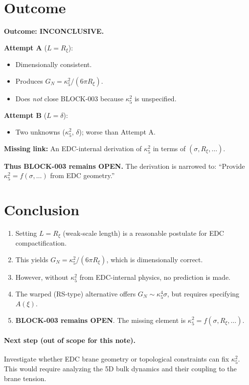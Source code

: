 \documentclass[11pt,a4paper]{article}
\begin{document}
\section{Outcome}
\label{sec:outcome}

\begin{failbox}
\textbf{Outcome: INCONCLUSIVE.}

\textbf{Attempt A} ($L = R_\xi$):
\begin{itemize}[nosep]
    \item Dimensionally consistent.
    \item Produces $G_N = \kappa_5^2 / (6\pi R_\xi)$.
    \item Does \emph{not} close BLOCK-003 because $\kappa_5^2$ is unspecified.
\end{itemize}

\textbf{Attempt B} ($L = \delta$):
\begin{itemize}[nosep]
    \item Two unknowns ($\kappa_5^2$, $\delta$); worse than Attempt A.
\end{itemize}

\textbf{Missing link:}
An EDC-internal derivation of $\kappa_5^2$ in terms of $(\sigma, R_\xi, \ldots)$.

\textbf{Thus BLOCK-003 remains OPEN.}
The derivation is narrowed to: ``Provide $\kappa_5^2 = f(\sigma, \ldots)$ from EDC geometry.''
\end{failbox}

\section{Conclusion}
\label{sec:conclusion}

\begin{enumerate}[nosep]
    \item Setting $L = R_\xi$ (weak-scale length) is a reasonable postulate for EDC compactification.
    \item This yields $G_N = \kappa_5^2 / (6\pi R_\xi)$, which is dimensionally correct.
    \item However, without $\kappa_5^2$ from EDC-internal physics, no prediction is made.
    \item The warped (RS-type) alternative offers $G_N \sim \kappa_5^4 \sigma$, but requires specifying $A(\xi)$.
    \item \textbf{BLOCK-003 remains OPEN}. The missing element is $\kappa_5^2 = f(\sigma, R_\xi, \ldots)$.
\end{enumerate}

\paragraph{Next step (out of scope for this note).}
Investigate whether EDC brane geometry or topological constraints can fix $\kappa_5^2$.
This would require analyzing the 5D bulk dynamics and their coupling to the brane tension.
\end{document}
